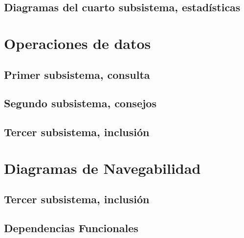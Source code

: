 \documentclass[a4paper, 11pt]{article}
\begin{document}
\newpage


\subsection{Diagramas del cuarto subsistema, estadísticas}


\newpage
\section{Operaciones de datos}

\subsection{Primer subsistema, consulta}


\subsection{Segundo subsistema, consejos}


\subsection{Tercer subsistema, inclusión}


\newpage

\section{Diagramas de Navegabilidad}

\subsection{ Tercer subsistema, inclusión}




\newpage
\subsection{Dependencias Funcionales}
\begin{itemize}



\end{itemize}
\end{document}
